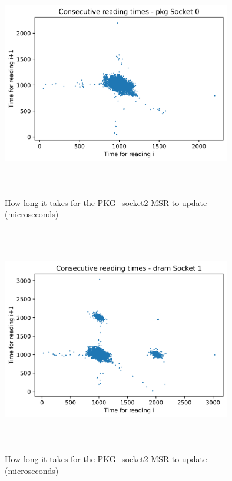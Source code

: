 \begin{figure}[H]
    \centering
    \includegraphics[width=10cm,height=10cm,keepaspectratio]{jmh/msr-update-rate/pkg_Socket_0-i_n-v-i_n1.png}
    \caption{How long it takes for the PKG\_socket2 MSR to update (microseconds)}
    \label{fig:PKG-rapl-counter}
\end{figure}

\begin{figure}[H]
    \centering
    \includegraphics[width=10cm,height=10cm,keepaspectratio]{jmh/msr-update-rate/dram_Socket_1-i_n-v-i_n1.png}
    \caption{How long it takes for the PKG\_socket2 MSR to update (microseconds)}
    \label{fig:PKG-rapl-counter}
\end{figure}

